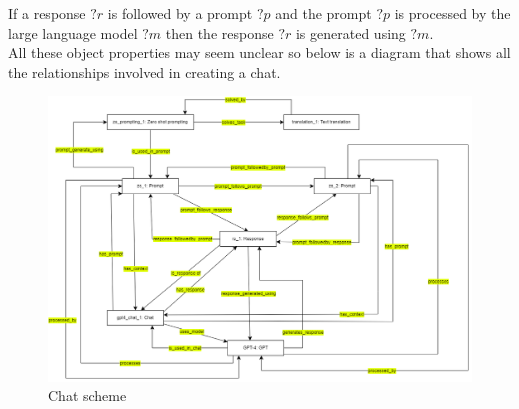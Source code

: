 If a response $?r$ is followed by a prompt $?p$ and the prompt $?p$ is processed by the large language model $?m$ then the response $?r$ is generated using $?m$.\\
All these object properties may seem unclear so below is a diagram that shows all the relationships involved in creating a chat.
\begin{figure}[H]
    \centering
    \includegraphics[width=0.85\linewidth]{Figures/fig_31.png}
    \caption{Chat scheme}
    \label{fig:enter-label}
\end{figure}


